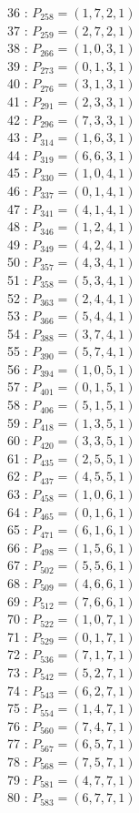 \documentclass{article}
\begin{document}
{\begin{multicols}{3}
36 : $P_{258}=( 1, 7, 2, 1 )$\\
37 : $P_{259}=( 2, 7, 2, 1 )$\\
38 : $P_{266}=( 1, 0, 3, 1 )$\\
39 : $P_{273}=( 0, 1, 3, 1 )$\\
40 : $P_{276}=( 3, 1, 3, 1 )$\\
41 : $P_{291}=( 2, 3, 3, 1 )$\\
42 : $P_{296}=( 7, 3, 3, 1 )$\\
43 : $P_{314}=( 1, 6, 3, 1 )$\\
44 : $P_{319}=( 6, 6, 3, 1 )$\\
45 : $P_{330}=( 1, 0, 4, 1 )$\\
46 : $P_{337}=( 0, 1, 4, 1 )$\\
47 : $P_{341}=( 4, 1, 4, 1 )$\\
48 : $P_{346}=( 1, 2, 4, 1 )$\\
49 : $P_{349}=( 4, 2, 4, 1 )$\\
50 : $P_{357}=( 4, 3, 4, 1 )$\\
51 : $P_{358}=( 5, 3, 4, 1 )$\\
52 : $P_{363}=( 2, 4, 4, 1 )$\\
53 : $P_{366}=( 5, 4, 4, 1 )$\\
54 : $P_{388}=( 3, 7, 4, 1 )$\\
55 : $P_{390}=( 5, 7, 4, 1 )$\\
56 : $P_{394}=( 1, 0, 5, 1 )$\\
57 : $P_{401}=( 0, 1, 5, 1 )$\\
58 : $P_{406}=( 5, 1, 5, 1 )$\\
59 : $P_{418}=( 1, 3, 5, 1 )$\\
60 : $P_{420}=( 3, 3, 5, 1 )$\\
61 : $P_{435}=( 2, 5, 5, 1 )$\\
62 : $P_{437}=( 4, 5, 5, 1 )$\\
63 : $P_{458}=( 1, 0, 6, 1 )$\\
64 : $P_{465}=( 0, 1, 6, 1 )$\\
65 : $P_{471}=( 6, 1, 6, 1 )$\\
66 : $P_{498}=( 1, 5, 6, 1 )$\\
67 : $P_{502}=( 5, 5, 6, 1 )$\\
68 : $P_{509}=( 4, 6, 6, 1 )$\\
69 : $P_{512}=( 7, 6, 6, 1 )$\\
70 : $P_{522}=( 1, 0, 7, 1 )$\\
71 : $P_{529}=( 0, 1, 7, 1 )$\\
72 : $P_{536}=( 7, 1, 7, 1 )$\\
73 : $P_{542}=( 5, 2, 7, 1 )$\\
74 : $P_{543}=( 6, 2, 7, 1 )$\\
75 : $P_{554}=( 1, 4, 7, 1 )$\\
76 : $P_{560}=( 7, 4, 7, 1 )$\\
77 : $P_{567}=( 6, 5, 7, 1 )$\\
78 : $P_{568}=( 7, 5, 7, 1 )$\\
79 : $P_{581}=( 4, 7, 7, 1 )$\\
80 : $P_{583}=( 6, 7, 7, 1 )$\\
\end{multicols}


}
\end{document}
